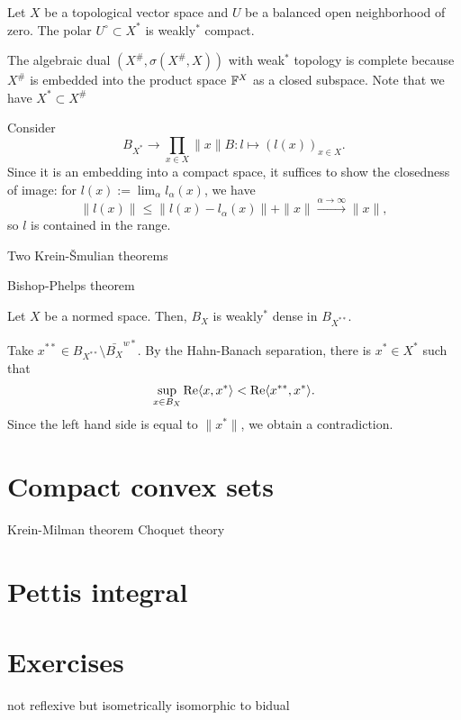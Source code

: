 \documentclass{../../large}
\begin{document}
\begin{prb}
Let $X$ be a topological vector space and $U$ be a balanced open neighborhood of zero.
The polar $U^\circ\subset X^*$ is weakly$^*$ compact.
\end{prb}
\begin{pf}
The algebraic dual $(X^\#,\sigma(X^\#,X))$ with weak$^*$ topology is complete because $X^\#$ is embedded into the product space $\mathbb{F}^X$ as a closed subspace.
Note that we have $X^*\subset X^\#$

Consider
\[B_{X^*}\to\prod_{x\in X}\|x\|B:l\mapsto(l(x))_{x\in X}.\]
Since it is an embedding into a compact space, it suffices to show the closedness of image: for $l(x):=\lim_\alpha l_\alpha(x)$, we have
\[\|l(x)\|\le\|l(x)-l_\alpha(x)\|+\|x\|\xrightarrow{\alpha\to\infty}\|x\|,\]
so $l$ is contained in the range.
\end{pf}
\begin{prb}
\end{prb}
\begin{prb}
\end{prb}






Two Krein-\v Smulian theorems




Bishop-Phelps theorem

\begin{prb}
Let $X$ be a normed space.
Then, $B_X$ is weakly$^*$ dense in $B_{X^{**}}$.
\end{prb}
\begin{pf}
Take $x^{**}\in B_{X^{**}}\setminus\bar{B_X}^{w*}$.
By the Hahn-Banach separation, there is $x^*\in X^*$ such that
\[\sup_{x\in B_X}\operatorname{Re}\langle x,x^*\rangle<\operatorname{Re}\langle x^{**},x^*\rangle.\]
Since the left hand side is equal to $\|x^*\|$, we obtain a contradiction.
\end{pf}


\section{Compact convex sets}
Krein-Milman theorem
Choquet theory


\section{Pettis integral}



\section*{Exercises}
\begin{prb}
not reflexive but isometrically isomorphic to bidual
\end{prb}
\end{document}
